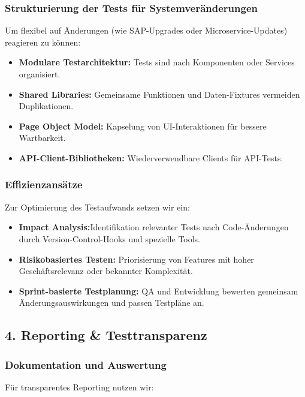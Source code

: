 \subsubsection{Strukturierung der Tests für Systemveränderungen}
Um flexibel auf Änderungen (wie SAP-Upgrades oder Microservice-Updates) reagieren zu können:

\begin{itemize}
    \item \textbf{Modulare Testarchitektur:} Tests sind nach Komponenten oder Services organisiert.
    \item \textbf{Shared Libraries:} Gemeinsame Funktionen und Daten-Fixtures vermeiden Duplikationen.
    \item \textbf{Page Object Model:} Kapselung von UI-Interaktionen für bessere Wartbarkeit.
    \item \textbf{API-Client-Bibliotheken:} Wiederverwendbare Clients für API-Tests.
\end{itemize}

\subsubsection{Effizienzansätze}
Zur Optimierung des Testaufwands setzen wir ein:

\begin{itemize}
    \item \textbf{Impact Analysis:}Identifikation relevanter Tests nach Code-Änderungen durch
    Version-Control-Hooks und spezielle Tools.
    \item \textbf{Risikobasiertes Testen:} Priorisierung von Features mit hoher Geschäftsrelevanz
    oder bekannter Komplexität.
    \item \textbf{Sprint-basierte Testplanung:} QA und Entwicklung bewerten gemeinsam
    Änderungsauswirkungen und passen Testpläne an.
\end{itemize}

\subsection{4. Reporting \& Testtransparenz}

\subsubsection{Dokumentation und Auswertung}
Für transparentes Reporting nutzen wir:

